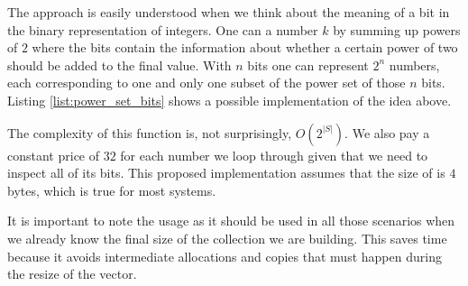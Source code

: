 The approach is easily understood when we think about the meaning of a bit in the binary representation of integers. One
can  a number $k$ by summing up powers of $2$ where the bits contain the information about whether a
certain power of two should be added to the final value. With $n$
bits one can represent $2^n$ numbers, each corresponding to one and only one subset of the power set of those $n$ bits.
Listing \ref{list:power_set_bits} shows  a possible \CC implementation of the idea above.




The complexity of this function is, not surprisingly, $O(2^{|S|})$. 
We also pay a constant price of $32$ for each number we loop through given that we need to inspect all of its bits.
This proposed implementation assumes that the size of  is $4$ bytes, which is true for most systems.

It is important to note the usage  as it should be used in all those scenarios when we already know the final size of the collection we are building.
This saves time because it avoids intermediate allocations and copies that must happen during the resize of the vector.








